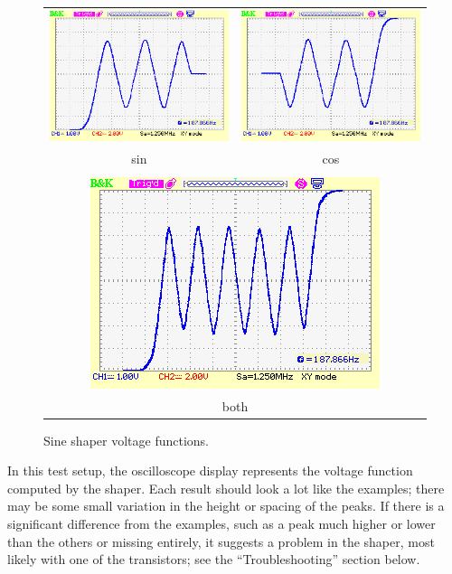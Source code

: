 \begin{figure}
\centering\begin{tabular}{cc}
\includegraphics[scale=0.65]{bk7.png} & \includegraphics[scale=0.65]{bk9.png}\\
sin & cos \\
\strut & \\
\multicolumn{2}{c}{\includegraphics[scale=0.65]{bk8.png}}\\
\multicolumn{2}{c}{both}
\end{tabular}\par
\caption{Sine shaper voltage functions.}\label{fig:shaper-samples}
\end{figure}

In this test setup, the oscilloscope display represents the voltage function
computed by the shaper.  Each result should look a lot like the examples;
there may be some small variation in the height or spacing of the peaks.  If
there is a significant difference from the examples, such as a peak much
higher or lower than the others or missing entirely, it suggests a problem
in the shaper, most likely with one of the transistors; see the
``Troubleshooting'' section below.

